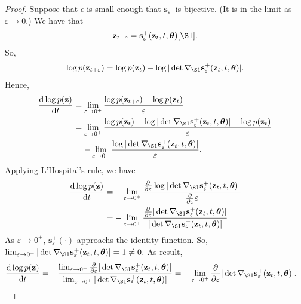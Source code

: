 \documentclass[10pt]{article}
\newcommand{\dee}{\mathrm{d}}
\newcommand{\ve}[1]{\mathbf{#1}}
\newcommand{\ves}[1]{\boldsymbol{#1}}
\begin{document}
\begin{itemize}
\begin{proof}
    Suppose that $\epsilon$ is small enough that $\ve{s}_{\varepsilon}^+$ is bijective. (It is in the limit as $\varepsilon \rightarrow 0$.) We have that
    \begin{align*}
      \ve{z}_{t+\varepsilon}  = \ve{s}_{\varepsilon}^+(\ve{z}_t, t, \ves{\theta})[\S1].
    \end{align*}
    So,
    \begin{align*}
      \log p(\ve{z}_{t+\varepsilon})  = \log p(\ve{z}_t) - \log |\det \nabla_{\S1} \ve{s}_\varepsilon^+(\ve{z}_t, t, \ves{\theta})|.
    \end{align*}
    Hence,
    \begin{align*}
      \frac{\dee \log p(\ve{z})}{\dee t}
      &= \lim_{\varepsilon \rightarrow 0^+} \frac{\log p(\ve{z}_{t+\varepsilon}) - \log p(\ve{z}_t)}{\varepsilon} \\
      &= \lim_{\varepsilon \rightarrow 0^+} \frac{\log p(\ve{z}_t) - \log |\det \nabla_{\S1} \ve{s}_\varepsilon^+(\ve{z}_t, t, \ves{\theta})| - \log p(\ve{z}_t)}{\varepsilon} \\
      &= - \lim_{\varepsilon \rightarrow 0^+} \frac{\log |\det \nabla_{\S1} \ve{s}_\varepsilon^+(\ve{z}_t, t, \ves{\theta})|}{\varepsilon}.
    \end{align*}
    Applying L'Hospital's rule, we have
    \begin{align*}
      \frac{\dee \log p(\ve{z})}{\dee t}
      &= -\lim_{\varepsilon \rightarrow 0^+} \frac{ \frac{\partial}{\partial \varepsilon} \log |\det \nabla_{\S1} \ve{s}_\varepsilon^+(\ve{z}_t, t, \ves{\theta})|}{ \frac{\partial}{\partial \varepsilon} \varepsilon} \\
      &= -\lim_{\varepsilon \rightarrow 0^+} \frac{ \frac{\partial}{\partial \varepsilon} |\det \nabla_{\S1} \ve{s}_\varepsilon^+(\ve{z}_t, t, \ves{\theta})|}{ |\det \nabla_{\S1} \ve{s}_\varepsilon^+(\ve{z}_t, t, \ves{\theta})| }
    \end{align*}
    As $\varepsilon \rightarrow 0^+$, $\ve{s}_\varepsilon^+(\cdot)$ approachs the identity function. So, $\lim_{\varepsilon \rightarrow 0^+}|\det \nabla_{\S1} \ve{s}_\varepsilon^+(\ve{z}_t, t, \ves{\theta})| = 1 \neq 0.$ As result,
    \begin{align*}
      \frac{\dee \log p(\ve{z})}{\dee t} &= - \frac{ \lim_{\varepsilon \rightarrow 0^+} \frac{\partial}{\partial \varepsilon} |\det \nabla_{\S1} \ve{s}_\varepsilon^+(\ve{z}_t, t, \ves{\theta})|}{ \lim_{\varepsilon \rightarrow 0^+} |\det \nabla_{\S1} \ve{s}_\varepsilon^+(\ve{z}_t, t, \ves{\theta})| }
      = -\lim_{\varepsilon \rightarrow 0^+} \frac{\partial}{\partial \varepsilon} |\det \nabla_{\S1} \ve{s}_\varepsilon^+(\ve{z}_t, t, \ves{\theta})|.

\end{align*}
\end{proof}
\end{itemize}
\end{document}

